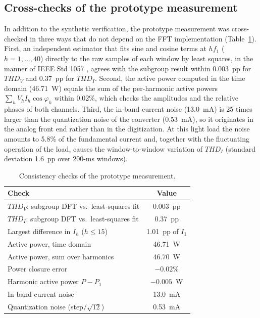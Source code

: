 \subsection*{Cross-checks of the prototype measurement}

In addition to the synthetic verification, the prototype measurement was cross-checked in three ways that do not depend on the FFT implementation (Table~\ref{tab:thd_consistency}). First, an independent estimator that fits sine and cosine terms at $h f_1$ ($h = 1, \dots, 40$) directly to the raw samples of each window by least squares, in the manner of IEEE Std 1057 \cite{ieee1057}, agrees with the subgroup result within 0.003~pp for $THD_V$ and 0.37~pp for $THD_I$. Second, the active power computed in the time domain (46.71~W) equals the sum of the per-harmonic active powers $\sum_h V_h I_h \cos\varphi_h$ within 0.02\%, which checks the amplitudes and the relative phases of both channels. Third, the in-band current noise (13.0~mA) is 25 times larger than the quantization noise of the converter (0.53~mA), so it originates in the analog front end rather than in the digitization. At this light load the noise amounts to 5.8\% of the fundamental current and, together with the fluctuating operation of the load, causes the window-to-window variation of $THD_I$ (standard deviation 1.6~pp over 200-ms windows).

\begin{table}[H]
\centering
\caption{Consistency checks of the prototype measurement.}
\label{tab:thd_consistency}
\begin{tabular}{lc}
\toprule
Check & Value \\
\midrule
$THD_V$: subgroup DFT vs.\ least-squares fit & 0.003~pp \\
$THD_I$: subgroup DFT vs.\ least-squares fit & 0.37~pp \\
Largest difference in $I_h$ ($h \le 15$) & 1.01~pp of $I_1$ \\
Active power, time domain & 46.71~W \\
Active power, sum over harmonics & 46.70~W \\
Power closure error & $-0.02$\% \\
Harmonic active power $P - P_1$ & $-0.005$~W \\
In-band current noise & 13.0~mA \\
Quantization noise (step$/\sqrt{12}$) & 0.53~mA \\
\bottomrule
\end{tabular}
\end{table}

